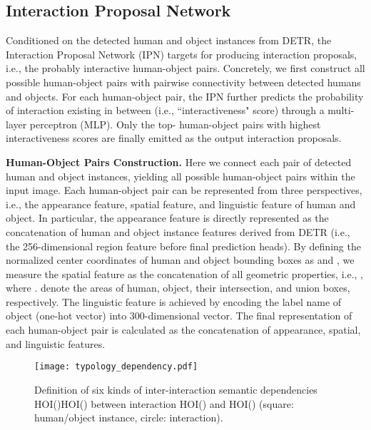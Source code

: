 \documentclass[10pt,twocolumn,letterpaper]{article}
\begin{document}
\subsection{Interaction Proposal Network}
Conditioned on the detected human and object instances from DETR, the Interaction Proposal Network (IPN) targets for producing interaction proposals, i.e., the probably interactive human-object pairs. Concretely, we first construct all possible human-object pairs with pairwise connectivity between detected humans and objects. For each human-object pair, the IPN further predicts the probability of interaction existing in between (i.e., ``interactiveness" score) through a multi-layer perceptron (MLP). Only the top- human-object pairs with highest interactiveness scores are finally emitted as the output interaction proposals.

\textbf{Human-Object Pairs Construction.}
Here we connect each pair of detected human and object instances, yielding all possible human-object pairs within the input image. Each human-object pair can be represented from three perspectives, i.e., the appearance feature, spatial feature, and linguistic feature of human and object. In particular, the appearance feature is directly represented as the concatenation of human and object instance features derived from DETR (i.e., the 256-dimensional region feature before final prediction heads). By defining the normalized center coordinates of human and object bounding boxes as  and , we measure the spatial feature as the concatenation of all geometric properties, i.e., , where .  denote the areas of human, object, their intersection, and union boxes, respectively. The linguistic feature is achieved by encoding the label name of object (one-hot vector) into 300-dimensional vector. The final representation of each human-object pair is calculated as the concatenation of appearance, spatial, and linguistic features.

\begin{figure}[t]
\vspace{-0.32in}
\begin{center}
   \texttt{[image: typology\_dependency.pdf]}
\end{center}
\vspace{-0.25in}
   \caption{Definition of six kinds of inter-interaction semantic dependencies HOI()HOI() between interaction HOI() and HOI() (square: human/object instance, circle: interaction).}
\label{fig:self-attention}
\vspace{-0.22in}
\end{figure}
\end{document}
